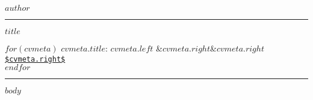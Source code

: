 \documentclass[10pt,A4]{article}
\newcommand{\mystrut}{\rule[-.3\baselineskip]{0pt}{\baselineskip}}
\begin{document}
\pagestyle{fancy}

\vspace{-8pt}
\begin{center}
	\LARGE \textsc{$author$} \textcolor{sectcol}{\rule[-1mm]{1mm}{0.5cm}}
	\LARGE $title$
\end{center}

\vspace{6pt}


$for(cvmeta)$
\footnotesize{\textbf{$cvmeta.title$}: $cvmeta.left$} \hspace*{\fill} \footnotesize{\ifx&$cvmeta.right$&{$cvmeta.right$}\else\href{$cvmeta.right$}{\nolinkurl{$cvmeta.right$}}\fi}\\[1pt]
$endfor$

\vspace{-2pt}
\textcolor{softcol}{\hrule}
\vspace{6pt}

\normalsize

\vspace{-6pt}
$body$


\null
\vspace*{\fill}
\hspace{-0.25\linewidth}\colorbox{white}{\makebox[1.5\linewidth][c]{\mystrut  \textnormal{\textcolor{sectcol}{$cvfooter.left$}  *  \textcolor{sectcol}{$cvfooter.right$}}}}
\end{document}
